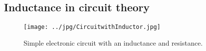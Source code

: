 \subsection{Inductance in circuit theory}


\begin{figure}[htbp]
\begin{center}
\texttt{[image: ../jpg/CircuitwithInductor.jpg]}
\end{center}
\caption{Simple electronic circuit with an inductance and resistance. }
\label{MutualInduc}
\end{figure}










 

